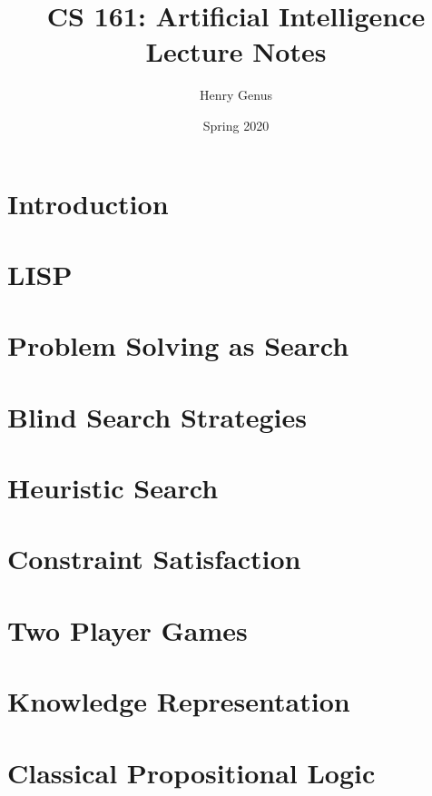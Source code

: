 \documentclass[9pt]{extarticle}
\title{%
	CS 161: Artificial Intelligence\\
	Lecture Notes}
\author{Henry Genus}
\date{Spring 2020}
\begin{document}
\maketitle
\tableofcontents
\newpage

\section{Introduction}

\newpage

\section{LISP}

\newpage

\section{Problem Solving as Search}

\newpage

\section{Blind Search Strategies}

\newpage

\section{Heuristic Search}

\newpage

\section{Constraint Satisfaction}

\newpage

\section{Two Player Games}

\newpage

\section{Knowledge Representation}

\newpage

\section{Classical Propositional Logic}

\newpage
\end{document}

